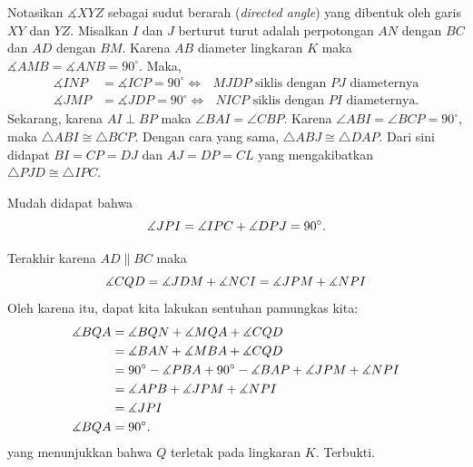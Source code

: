 \documentclass[a4paper, 12pt]{scrartcl}
\begin{document}
Notasikan $\measuredangle XYZ$ sebagai sudut berarah (\textit{directed angle}) yang dibentuk oleh garis $XY$ dan $YZ$.
Misalkan $I$ dan $J$ berturut turut adalah perpotongan $AN$ dengan $BC$ dan $AD$ dengan $BM$.
Karena $AB$ diameter lingkaran $K$ maka $\measuredangle AMB = \measuredangle ANB = 90^\circ$. Maka,
\begin{align*}
    \measuredangle INP &= \measuredangle ICP = 90^\circ \iff \text{ $MJDP$ siklis dengan $PJ$ diameternya}\\
    \measuredangle JMP &= \measuredangle JDP = 90^\circ \iff \text{ $NICP$ siklis dengan $PI$ diameternya.}
\end{align*}
Sekarang, karena $AI \perp BP$ maka $\angle BAI = \angle CBP$. Karena $\angle ABI = \angle BCP = 90^\circ$, maka $\triangle ABI \cong \triangle BCP$. Dengan cara yang sama, $\triangle ABJ \cong \triangle DAP$.
Dari sini didapat $BI = CP = DJ$ dan $AJ = DP = CL$ yang mengakibatkan $\triangle PJD \cong \triangle IPC$.

Mudah didapat bahwa 
$$\measuredangle JPI = \measuredangle IPC + \measuredangle DPJ = 90^\circ.$$

Terakhir karena $AD \parallel BC$ maka $$\measuredangle CQD = \measuredangle JDM + \measuredangle NCI = \measuredangle JPM + \measuredangle NPI$$
Oleh karena itu, dapat kita lakukan sentuhan pamungkas kita:
\begin{align*}
    \measuredangle BQA &= \measuredangle BQN + \measuredangle MQA+ \measuredangle CQD\\
    &= \measuredangle BAN + \measuredangle MBA + \measuredangle CQD\\
    &= 90^\circ - \measuredangle PBA + 90^\circ - \measuredangle BAP + \measuredangle JPM + \measuredangle NPI\\
    &= \measuredangle APB + \measuredangle JPM + \measuredangle NPI\\
    &= \measuredangle JPI\\
    \measuredangle BQA &= 90^\circ.
\end{align*}
yang menunjukkan bahwa $Q$ terletak pada lingkaran $K$. Terbukti.
\end{document}
